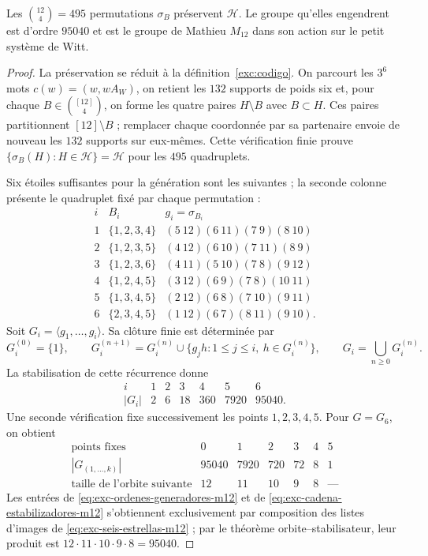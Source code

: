 \begin{proposition}
\label{exc:m12}
Les $\binom{12}4=495$ permutations $\sigma_B$ préservent $\mathcal H$.
Le groupe qu'elles engendrent est d'ordre $95040$ et est le groupe de Mathieu
$M_{12}$ dans son action sur le petit système de Witt.
\end{proposition}

\begin{proof}
La préservation se réduit à la définition~\ref{exc:codigo}. On parcourt les
$3^6$ mots $c(w)=(w,wA_W)$, on retient les $132$ supports de poids six
et, pour chaque $B\in\binom{[12]}4$, on forme les quatre paires
$H\setminus B$ avec $B\subset H$. Ces paires partitionnent
$[12]\setminus B$ ; remplacer chaque coordonnée par sa partenaire envoie
de nouveau les $132$ supports sur eux-mêmes. Cette vérification finie prouve
\(\{\sigma_B(H):H\in\mathcal H\}=\mathcal H\) pour les $495$ quadruplets.

Six étoiles suffisantes pour la génération sont les suivantes ; la seconde colonne présente le quadruplet fixé par chaque permutation :
\[
\begin{array}{c|c|l}
i&B_i&g_i=\sigma_{B_i}\\ \hline
1&\{1,2,3,4\}&(5\ 12)(6\ 11)(7\ 9)(8\ 10)\\
2&\{1,2,3,5\}&(4\ 12)(6\ 10)(7\ 11)(8\ 9)\\
3&\{1,2,3,6\}&(4\ 11)(5\ 10)(7\ 8)(9\ 12)\\
4&\{1,2,4,5\}&(3\ 12)(6\ 9)(7\ 8)(10\ 11)\\
5&\{1,3,4,5\}&(2\ 12)(6\ 8)(7\ 10)(9\ 11)\\
6&\{2,3,4,5\}&(1\ 12)(6\ 7)(8\ 11)(9\ 10).
\end{array}
\tag{M12.1}
\label{eq:exc-seis-estrellas-m12}
\]
Soit $G_i=\langle g_1,\ldots,g_i\rangle$. Sa clôture finie est
déterminée par
\[
 G_i^{(0)}=\{1\},\qquad
 G_i^{(n+1)}=G_i^{(n)}\cup
 \{g_jh:1\leq j\leq i,\ h\in G_i^{(n)}\},\qquad
 G_i=\bigcup_{n\geq0}G_i^{(n)}.
\tag{M12.2}
\label{eq:exc-clausura-finita-m12}
\]
La stabilisation de cette récurrence donne
\[
\begin{array}{c|rrrrrr}
i&1&2&3&4&5&6\\ \hline
|G_i|&2&6&18&360&7920&95040.
\end{array}
\tag{M12.3}
\label{eq:exc-ordenes-generadores-m12}
\]
Une seconde vérification fixe successivement les points $1,2,3,4,5$. Pour
$G=G_6$, on obtient
\[
\begin{array}{c|rrrrrr}
\text{points fixes}&0&1&2&3&4&5\\ \hline
|G_{(1,\ldots,k)}|&95040&7920&720&72&8&1\\
\text{taille de l’orbite suivante}&12&11&10&9&8&\text{---}
\end{array}
\tag{M12.4}
\label{eq:exc-cadena-estabilizadores-m12}
\]
Les entrées de \eqref{eq:exc-ordenes-generadores-m12} et de \eqref{eq:exc-cadena-estabilizadores-m12} s'obtiennent exclusivement par composition des listes d'images de \eqref{eq:exc-seis-estrellas-m12} ; par le théorème orbite--stabilisateur, leur produit est $12\cdot11\cdot10\cdot9\cdot8=95040$.


\end{proof}
